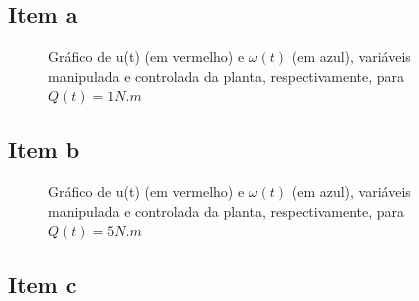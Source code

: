 \documentclass[11pt]{article}
\begin{document}
\subsection{Item a}
\begin{figure}[!htb]
        \caption{\label{fig:my-label} Gráfico de u(t) (em vermelho) e $\omega(t)$ (em azul), variáveis manipulada e controlada da planta, respectivamente, para $Q(t) = 1 N.m$}
      \end{figure}
      
\subsection{Item b}
\begin{figure}[!htb]
        \caption{\label{fig:my-label} Gráfico de u(t) (em vermelho) e $\omega(t)$ (em azul), variáveis manipulada e controlada da planta, respectivamente, para $Q(t) = 5 N.m$}
      \end{figure}

\subsection{Item c}
\end{document}
